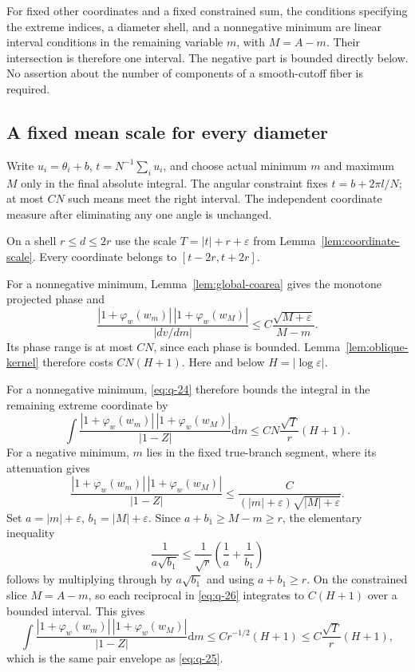 \documentclass[11pt]{article}
\numberwithin{equation}{section}
\theoremstyle{remark}\newtheorem{remark}[theorem]{Remark}
\newcommand{\dd}{\mathrm d}
\begin{document}
For fixed other coordinates and a fixed constrained sum,
the conditions specifying the extreme indices, a diameter
shell, and a nonnegative minimum are linear interval conditions
in the remaining variable $m$, with $M=A-m$.
Their intersection is therefore one interval. The negative
part is bounded directly below. No assertion about the number
of components of a smooth-cutoff fiber is required.

\subsection{A fixed mean scale for every diameter}


Write $u_i=\theta_i+b$, $t=N^{-1}\sum_i u_i$, and choose actual
minimum $m$ and maximum $M$ only in the final absolute integral.
The angular constraint fixes $t=b+2\pi l/N$; at most $CN$ such means
meet the right interval. The independent coordinate measure after
eliminating any one angle is unchanged.

On a shell $r\le d\le2r$ use the scale
$T=|t|+r+\varepsilon$ from Lemma~\ref{lem:coordinate-scale}.
Every coordinate belongs to $[t-2r,t+2r]$.

For a nonnegative minimum, Lemma~\ref{lem:global-coarea}
gives the monotone projected phase and
\begin{equation}\label{eq:q-24}
 \frac{|1+\varphi_w(w_m)|\,|1+\varphi_w(w_M)|}
 {|dv/dm|}\le C\frac{\sqrt{M+\varepsilon}}{M-m}.
\end{equation}
Its phase range is at most $CN$, since each phase is bounded.
Lemma~\ref{lem:oblique-kernel} therefore costs $CN(H+1)$.
Here and below $H=|\log\varepsilon|$.

For a nonnegative minimum, \eqref{eq:q-24} therefore bounds the integral in
the remaining extreme coordinate by
\begin{equation}\label{eq:q-25}
\int \frac{|1+\varphi_w(w_m)|\,|1+\varphi_w(w_M)|}{|1-Z|}\dd m
       \le CN\frac{\sqrt T}{r}(H+1).
\end{equation}
For a negative minimum, $m$ lies in the fixed true-branch segment,
where its attenuation gives
\[
 \frac{|1+\varphi_w(w_m)|\,|1+\varphi_w(w_M)|}{|1-Z|}
 \le \frac{C}{(|m|+\varepsilon)\sqrt{|M|+\varepsilon}}.
\]
Set $a=|m|+\varepsilon$, $b_1=|M|+\varepsilon$. Since
$a+b_1\ge M-m\ge r$, the elementary inequality
\begin{equation}\label{eq:q-26}
\frac1{a\sqrt{b_1}}
 \le \frac1{\sqrt r}\left(\frac1a+\frac1{b_1}\right)
\end{equation}
follows by multiplying through by $a\sqrt{b_1}$ and using
$a+b_1\ge r$. On the constrained slice $M=A-m$, so each reciprocal
in \eqref{eq:q-26} integrates to $C(H+1)$ over a bounded interval. This gives
\begin{equation}\label{eq:q-27}
\int \frac{|1+\varphi_w(w_m)|\,|1+\varphi_w(w_M)|}{|1-Z|}\dd m
 \le Cr^{-1/2}(H+1)\le C\frac{\sqrt T}{r}(H+1),
\end{equation}
which is the same pair envelope as \eqref{eq:q-25}. 
\end{document}
